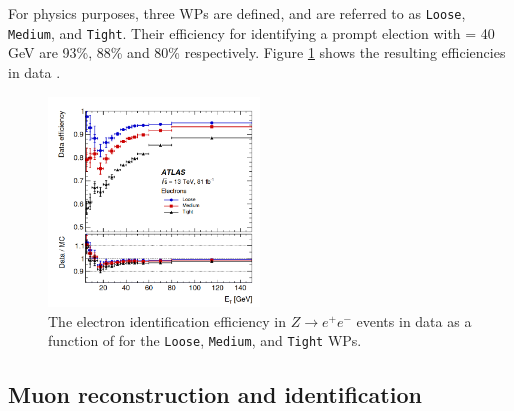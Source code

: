 For physics purposes, three WPs are defined, and are referred to as \texttt{Loose}, \texttt{Medium}, and \texttt{Tight}. Their efficiency for identifying a prompt election with \eT = 40 GeV are 93\%, 88\% and 80\% respectively. Figure \ref{fig:chap2:Objects:Egamma:EID:Eff} shows the resulting efficiencies in data \cite{Egamma_Perf_run2}.
\begin{figure}[htbp]
    \centering
    \includegraphics[width=0.5\textwidth]{Ch2/Img/Electron_ID_Eff.png}
    \caption{The electron identification efficiency in $Z\rightarrow e^+e^-$ events in data as a function of \eT for the \texttt{Loose}, \texttt{Medium}, and \texttt{Tight} WPs.}
    \label{fig:chap2:Objects:Egamma:EID:Eff}
\end{figure}

\subsection{Muon reconstruction and identification}
\label{chap2:Objects:Muon}
